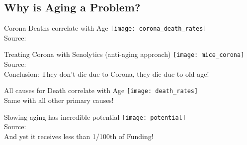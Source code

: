 \subsection{Why is Aging a Problem?}

\begin{frame}[c]{Corona Deaths correlate with Age}
    \large
    \texttt{[image: corona\_death\_rates]} \\
    Source: \cite{10.1111/acel.13230} \\
\end{frame}


\begin{frame}[c]{Treating Corona with Senolytics (anti-aging approach)}
    \texttt{[image: mice\_corona]} \\
    Source: \cite{camell2021senolytics} \\
    \pause
    Conclusion: They don't die due to Corona, they die due to old age!
\end{frame}


\begin{frame}[c]{All causes for Death correlate with Age}
    \large
    \texttt{[image: death\_rates]} \\
    \pause
    Same with all other primary causes!
\end{frame}


\begin{frame}[c]{Slowing aging has incredible potential}
    \large
    \texttt{[image: potential]} \\
    Source: \cite{10.1093/ppar/prz022} \\
    \pause
    And yet it receives less than 1/100th of Funding!
\end{frame}


